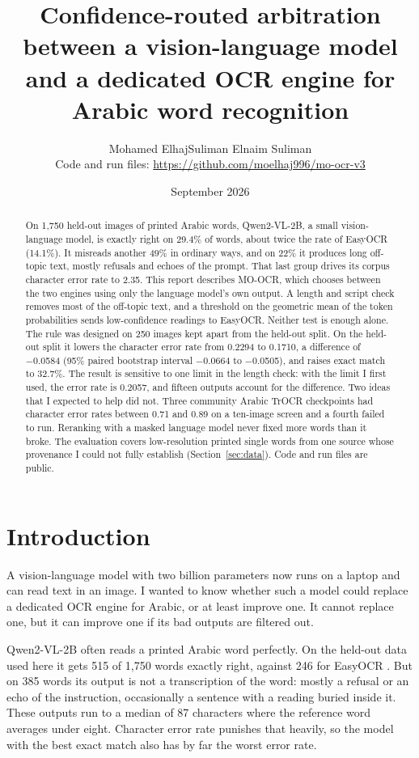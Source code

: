 \documentclass[11pt,a4paper]{article}
\title{\textbf{Confidence-routed arbitration between a vision-language model
and a dedicated OCR engine for Arabic word recognition}}
\author{Mohamed ElhajSuliman Elnaim Suliman\\[0.3em]
\small Code and run files: \url{https://github.com/moelhaj996/mo-ocr-v3}}
\date{September 2026}
\begin{document}
\maketitle

\begin{abstract}
\noindent
On 1,750 held-out images of printed Arabic words, Qwen2-VL-2B, a small
vision-language model, is exactly right on 29.4\% of words, about twice the
rate of EasyOCR (14.1\%). It misreads another 49\% in ordinary ways, and on
22\% it produces long off-topic text, mostly refusals and echoes of the
prompt. That last group drives its corpus character error rate to 2.35. This
report describes MO-OCR, which chooses between the two engines using only the
language model's own output. A length and script check removes most of the
off-topic text, and a threshold on the geometric mean of the token
probabilities sends low-confidence readings to EasyOCR. Neither test is
enough alone. The rule was designed on 250 images kept apart from the held-out
split. On the held-out split it lowers the character error rate from 0.2294 to
0.1710, a difference of −0.0584 (95\% paired bootstrap interval −0.0664 to
−0.0505), and raises exact match to 32.7\%. The result is sensitive to one
limit in the length check: with the limit I first used, the error rate is
0.2057, and fifteen outputs account for the difference. Two ideas that I
expected to help did not. Three community
Arabic TrOCR checkpoints had character error rates between 0.71 and 0.89 on a
ten-image screen and a fourth failed to run. Reranking with a masked language
model never fixed more words than it broke.
The evaluation covers low-resolution printed single words from one source
whose provenance I could not fully establish (Section~\ref{sec:data}). Code
and run files are public.
\end{abstract}

\section{Introduction}

A vision-language model with two billion parameters now runs on a laptop and
can read text in an image. I wanted to know whether such a model could replace
a dedicated OCR engine for Arabic, or at least improve one. It cannot replace
one, but it can improve one if its bad outputs are filtered out.

Qwen2-VL-2B \cite{qwen2vl} often reads a printed Arabic word perfectly. On the
held-out data used here it gets 515 of 1,750 words exactly right, against 246
for EasyOCR \cite{easyocr}. But on 385 words its output is not a transcription
of the word: mostly a refusal or an echo of the instruction, occasionally a
sentence with a reading buried inside it. These outputs run to a median of 87
characters where the reference word averages under eight.
Character error rate punishes that heavily, so the model with the best exact
match also has by far the worst error rate.
\end{document}
